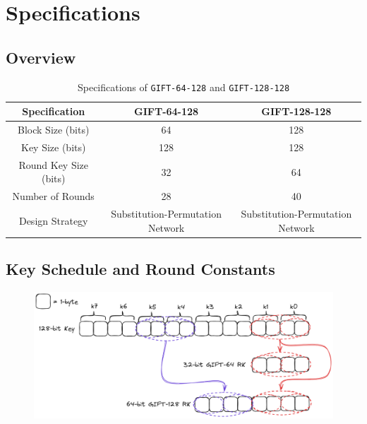 \chapter{Specifications}

\section*{Overview}

\begin{table}[h]
	\centering
	\begin{tabular}{|c||c|c|}
		\hline
		\textbf{Specification} & \textbf{GIFT-64-128} & \textbf{GIFT-128-128} \\ \hline
		Block Size (bits)      & 64                   & 128                   \\ \hline
		Key Size (bits)        & 128                  & 128                   \\ \hline
		Round Key Size (bits)  & 32                   & 64                    \\ \hline
		Number of Rounds       & 28                   & 40                    \\ \hline
		Design Strategy        & Substitution-Permutation Network & Substitution-Permutation Network \\ \hline
	\end{tabular}
	\caption{Specifications of \texttt{GIFT-64-128} and \texttt{GIFT-128-128}}
	\label{table:gift-specifications}
\end{table}

\newpage
\section{Key Schedule and Round Constants}

\begin{figure}[h!]\centering
\includegraphics[scale=.3]{image/key_schedule1.png}
\end{figure}

